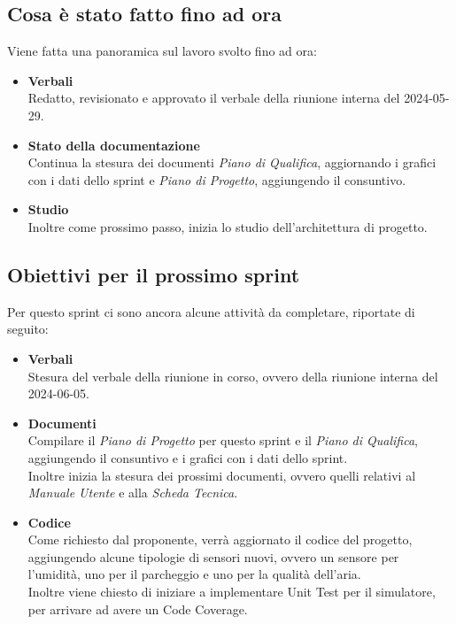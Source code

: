 \documentclass[italian,12pt]{article}
\begin{document}
\subsection{Cosa è stato fatto fino ad ora}
Viene fatta una panoramica sul lavoro svolto fino ad ora:
\begin{itemize}
	\item \textbf{Verbali} \\
		  Redatto, revisionato e approvato il verbale della riunione interna del 2024-05-29.
	\item \textbf{Stato della documentazione} \\
		  Continua la stesura dei documenti \textit{Piano di Qualifica}, aggiornando i grafici con i dati dello sprint e \textit{Piano di Progetto}, aggiungendo il consuntivo.
	\item \textbf{Studio} \\
		  Inoltre come prossimo passo, inizia lo studio dell'architettura di progetto.
\end{itemize}

\subsection{Obiettivi per il prossimo sprint}
Per questo sprint ci sono ancora alcune attività da completare, riportate di seguito:
\begin{itemize}
	\item \textbf{Verbali} \\
		  Stesura del verbale della riunione in corso, ovvero della riunione interna del 2024-06-05.
	\item \textbf{Documenti} \\
		  Compilare il \textit{Piano di Progetto} per questo sprint e il \textit{Piano di Qualifica}, aggiungendo il consuntivo e i grafici con i dati dello sprint. \\
		  Inoltre inizia la stesura dei prossimi documenti, ovvero quelli relativi al \textit{Manuale Utente} e alla \textit{Scheda Tecnica}.
	\item \textbf{Codice} \\
		  Come richiesto dal proponente, verrà aggiornato il codice del progetto, aggiungendo alcune tipologie di sensori nuovi, ovvero un sensore per l'umidità, uno per il parcheggio e uno per la qualità dell'aria. \\
		  Inoltre viene chiesto di iniziare a implementare Unit Test per il simulatore, per arrivare ad avere un Code Coverage.
\end{itemize}
\end{document}
